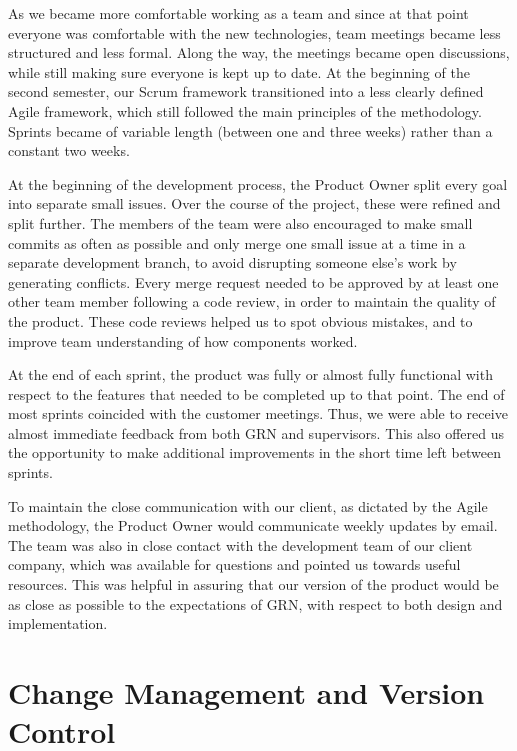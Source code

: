 \documentclass{l3proj}
\begin{document}
As we became more comfortable working as a team and since at that
 point everyone was comfortable with the new technologies, team
 meetings became less structured and less formal. Along the way,
 the meetings became open discussions, while still making sure
 everyone is kept up to date. At the beginning of the second
 semester, our Scrum framework transitioned into a less clearly
 defined Agile framework, which still followed the main principles
 of the methodology. Sprints became of variable length (between
 one and three weeks) rather than a constant two weeks.

 

At the beginning of the development process, the Product Owner split
 every goal into separate small issues. Over the course of the project,
 these were refined and split further. The members of the team were
 also encouraged to make small commits as often as possible and only
 merge one small issue at a time in a separate development branch,
 to avoid disrupting someone else's work by generating conflicts.
 Every merge request needed to be approved by at least one other
 team member following a code review, in order to maintain the quality
 of the product. These code reviews helped us to spot obvious mistakes,
 and to improve team understanding of how components worked.

At the end of each sprint, the product was fully or almost fully
 functional with respect to the features that needed to be completed
 up to that point. The end of most sprints coincided with the customer
 meetings. Thus, we were able to receive almost immediate feedback
 from both GRN and supervisors. This also offered us the opportunity
 to make additional improvements in the short time left between sprints.

To maintain the close communication with our client, as dictated by
 the Agile methodology, the Product Owner would communicate weekly
 updates by email. The team was also in close contact with the
 development team of our client company, which was available
 for questions and pointed us towards useful resources. This
 was helpful in assuring that our version of the product would
 be as close as possible to the expectations of GRN, with respect
 to both design and implementation.

\section{Change Management and Version Control}
\label{sec:changemgmt}
\end{document}
